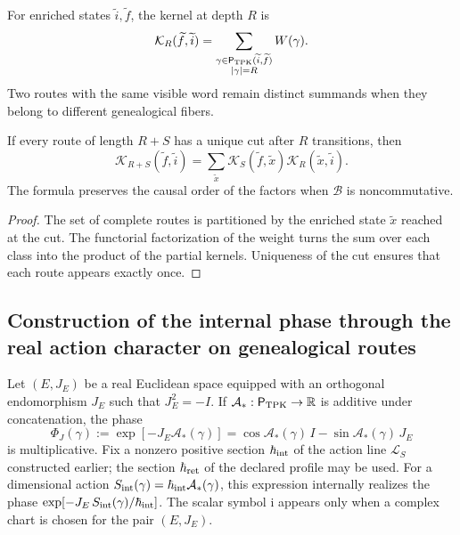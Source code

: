 For enriched states \(\widetilde i,\widetilde f\), the kernel at
depth \(R\) is
\begin{equation}
 \mathcal K_R(\widetilde f,\widetilde i)
 =\sum_{\substack{
   \gamma\in\mathsf P_{\rm TPK}(\widetilde i,\widetilde f)\\
   |\gamma|=R}}
 W(\gamma).
 \label{eq:kernel-genealogico-finito-rev2}
\end{equation}
Two routes with the same visible word remain distinct summands
when they belong to different genealogical fibers.

\begin{proposition}
\label{prop:composicion-kernel-enriquecido-rev2}
If every route of length \(R+S\) has a unique cut after \(R\)
transitions, then
\[
 \mathcal K_{R+S}(\widetilde f,\widetilde i)
 =\sum_{\widetilde x}
 \mathcal K_S(\widetilde f,\widetilde x)
 \mathcal K_R(\widetilde x,\widetilde i).
\]
The formula preserves the causal order of the factors when \(\mathcal B\) is
noncommutative.
\end{proposition}

\begin{proof}
The set of complete routes is partitioned by the enriched state
\(\widetilde x\) reached at the cut. The functorial factorization of the weight
turns the sum over each class into the product of the partial kernels.
Uniqueness of the cut ensures that each route appears exactly once.
\end{proof}

\subsection{Construction of the internal phase through the real action character on genealogical routes}

Let \((E,J_E)\) be a real Euclidean space equipped with an orthogonal
endomorphism \(J_E\) such that \(J_E^2=-I\). If
\(\mathcal A_*:\mathsf P_{\rm TPK}\to\mathbb R\) is additive under
concatenation, the phase
\begin{equation}
 \Phi_J(\gamma)
 :=\exp[-J_E\mathcal A_*(\gamma)]
 =\cos\mathcal A_*(\gamma)\,I
  -\sin\mathcal A_*(\gamma)\,J_E
 \label{eq:fase-interna-caminos-rev2}
\end{equation}
is multiplicative. Fix a nonzero positive section
\(\hbar_{\rm int}\) of the action line \(\mathcal L_S\)
constructed earlier; the section
\(\hbar_{\rm ret}\) of the declared profile may be used.
For a dimensional action
\(S_{\rm int}(\gamma)=\hbar_{\rm int}\mathcal A_*(\gamma)\), this
expression internally realizes the phase
\(\exp[-J_E\,S_{\rm int}(\gamma)/\hbar_{\rm int}]\). The scalar symbol
\(\mathrm i\) appears only when a complex chart is chosen for the pair
\((E,J_E)\).

